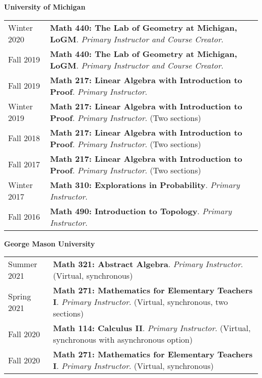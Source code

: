 
    \medskip


    \medskip
    \medskip



    \textbf{\large University of Michigan}
    
    \begin{center}
    {
    \renewcommand{\arraystretch}{1.2}
    \begin{longtable}{p{}  p{}}
      Winter 2020 & \textbf{{\normalfont Math 440:} The Lab of Geometry at Michigan, LoGM}. \textit{Primary Instructor and Course Creator}.  \\ 
  Fall 2019 & \textbf{{\normalfont Math 440:} The Lab of Geometry at Michigan, LoGM}. \textit{Primary Instructor and Course Creator}.  \\ 
  Fall 2019 & \textbf{{\normalfont Math 217:} Linear Algebra with Introduction to Proof}. \textit{Primary Instructor}.  \\ 
  Winter 2019 & \textbf{{\normalfont Math 217:} Linear Algebra with Introduction to Proof}. \textit{Primary Instructor}. (Two sections) \\ 
  Fall 2018 & \textbf{{\normalfont Math 217:} Linear Algebra with Introduction to Proof}. \textit{Primary Instructor}. (Two sections) \\ 
  Fall 2017 & \textbf{{\normalfont Math 217:} Linear Algebra with Introduction to Proof}. \textit{Primary Instructor}. (Two sections) \\ 
  Winter 2017 & \textbf{{\normalfont Math 310:} Explorations in Probability}. \textit{Primary Instructor}.  \\ 
  Fall 2016 & \textbf{{\normalfont Math 490:} Introduction to Topology}. \textit{Primary Instructor}.  
    \end{longtable}
    } 
    \end{center}

    \vspace{-1em}
    

    \textbf{\large George Mason University}
    
    \begin{center}
    {
    \renewcommand{\arraystretch}{1.2}
    \begin{longtable}{p{}  p{}}
      Summer 2021 & \textbf{{\normalfont Math 321:} Abstract Algebra}. \textit{Primary Instructor}. (Virtual, synchronous) \\ 
  Spring 2021 & \textbf{{\normalfont Math 271:} Mathematics for Elementary Teachers I}. \textit{Primary Instructor}. (Virtual, synchronous, two sections) \\ 
  Fall 2020 & \textbf{{\normalfont Math 114:} Calculus II}. \textit{Primary Instructor}. (Virtual, synchronous with asynchronous option) \\ 
  Fall 2020 & \textbf{{\normalfont Math 271:} Mathematics for Elementary Teachers I}. \textit{Primary Instructor}. (Virtual, synchronous) 
    \end{longtable}
    } 
    \end{center}

